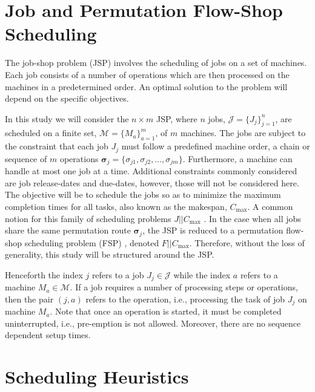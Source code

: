 \documentclass[smallextended]{svjour3}
\renewcommand{\vsigma}{\bm \sigma}
\begin{document}
	\section{Job and Permutation Flow-Shop Scheduling}\label{sec:problemdef}
	The job-shop problem (JSP) involves the scheduling of jobs on a set of machines. Each job consists of a number of operations which are then processed on the machines in a predetermined order. An optimal solution to the problem will depend on the specific objectives. 
	
	In this study we will consider the $n\times m$ JSP,  where $n$ jobs, $\mathcal{J}=\{J_j\}_{j=1}^n$, are scheduled on a finite set, $\mathcal{M}=\{M_a\}_{a=1}^m$, of $m$ machines. The jobs are subject to the constraint that each job $J_j$ must follow a predefined machine order, a chain or sequence of $m$ operations $\vsigma_j=\{\sigma_{j1},\sigma_{j2},\dotsc,\sigma_{jm}\}$. Furthermore, a machine can handle at most one job at a time. Additional constraints commonly considered are job release-dates and due-dates, however, those will not be considered here. 
	The objective will be to schedule the jobs so as to minimize the maximum completion times for all tasks, also known as the makespan, $C_{\max}$. A common notion for this family of scheduling problems $J||C_{\max}$ \citep{Pinedo08}. 
	In the case when all jobs share the same permutation route $\vsigma_j$, the JSP is reduced to a permutation flow-shop scheduling problem (FSP) \citep{Guinet1998,Tay08}, denoted $F||C_{\max}$. Therefore, without the loss of generality, this study will be structured around the JSP. 
		
	Henceforth the index $j$ refers to a job $J_j\in\mathcal{J}$ while the index $a$ refers to a machine $M_a\in\mathcal{M}$. If a job requires a number of processing steps or operations, then the pair $(j,a)$ refers to the operation, i.e., processing the task of job $J_j$ on machine $M_a$. Note that once an operation is started, it must be completed uninterrupted, i.e., pre-emption is not allowed. Moreover, there are no sequence dependent setup times.
		
	\section{Scheduling Heuristics} \label{sec:constructionjssp}
	
\end{document}
